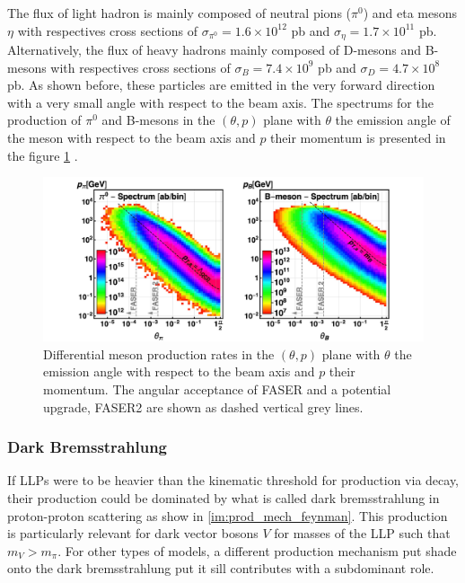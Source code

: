 		The flux of light hadron is mainly composed of neutral pions ($\pi^0$) and eta mesons $\eta$ with respectives cross sections of $\sigma_{\pi^0} = 1.6 \times 10^{12}$ pb and $\sigma_{\eta} = 1.7 \times 10^{11}$ pb. Alternatively, the flux of heavy hadrons mainly composed of D-mesons and B-mesons with respectives cross sections of $\sigma_{B} = 7.4 \times 10^{9}$ pb and $\sigma_{D} = 4.7 \times 10^{8}$ pb. As shown before, these particles are emitted in the very forward direction with a very small angle with respect to the beam axis. The spectrums for the production of $\pi^0$ and B-mesons in the $(\theta, p)$ plane with $\theta$ the emission angle of the meson with respect to the beam axis and $p$ their momentum is presented in the figure \ref{im:hadron_flux}  \cite{FASER_LLP}.
	 	\begin{figure}[h]
			\centering
			\includegraphics[width=0.95\linewidth]{files/pi0_B_meson_flux}
			\caption{Differential meson production rates in the $(\theta, p)$ plane with $\theta$ the emission angle with respect to the beam axis and $p$ their momentum. The angular acceptance of FASER and a potential upgrade, FASER2 are shown as dashed vertical grey lines.}
			\label{im:hadron_flux}
		\end{figure}

		
		\subsubsection{Dark Bremsstrahlung}
		If LLPs were to be heavier than the kinematic threshold for production via decay, their production could be dominated by what is called dark bremsstrahlung in proton-proton scattering as show in \ref{im:prod_mech_feynman}. This production is particularly relevant for dark vector bosons $V$ for masses of the LLP such that $m_V > m_\pi$. For other types of models, a different production mechanism put shade onto the dark bremsstrahlung put it sill contributes with a subdominant role. 
		
